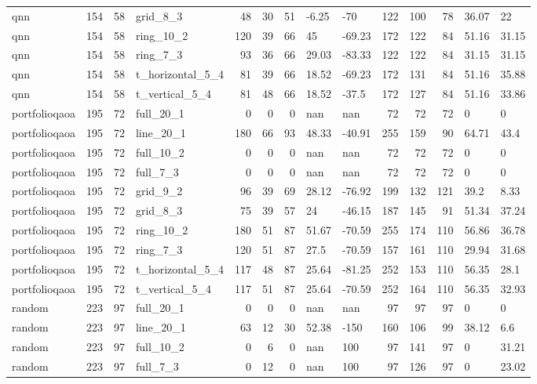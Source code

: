 \begin{longtable}{lrrlrrrllrrrll}
qnn & 154 & 58 & grid\_8\_3 & 48 & 30 & 51 & -6.25 & -70 & 122 & 100 & 78 & 36.07 & 22 \\
qnn & 154 & 58 & ring\_10\_2 & 120 & 39 & 66 & 45 & -69.23 & 172 & 122 & 84 & 51.16 & 31.15 \\
qnn & 154 & 58 & ring\_7\_3 & 93 & 36 & 66 & 29.03 & -83.33 & 122 & 122 & 84 & 31.15 & 31.15 \\
qnn & 154 & 58 & t\_horizontal\_5\_4 & 81 & 39 & 66 & 18.52 & -69.23 & 172 & 131 & 84 & 51.16 & 35.88 \\
qnn & 154 & 58 & t\_vertical\_5\_4 & 81 & 48 & 66 & 18.52 & -37.5 & 172 & 127 & 84 & 51.16 & 33.86 \\
portfolioqaoa & 195 & 72 & full\_20\_1 & 0 & 0 & 0 & nan & nan & 72 & 72 & 72 & 0 & 0 \\
portfolioqaoa & 195 & 72 & line\_20\_1 & 180 & 66 & 93 & 48.33 & -40.91 & 255 & 159 & 90 & 64.71 & 43.4 \\
portfolioqaoa & 195 & 72 & full\_10\_2 & 0 & 0 & 0 & nan & nan & 72 & 72 & 72 & 0 & 0 \\
portfolioqaoa & 195 & 72 & full\_7\_3 & 0 & 0 & 0 & nan & nan & 72 & 72 & 72 & 0 & 0 \\
portfolioqaoa & 195 & 72 & grid\_9\_2 & 96 & 39 & 69 & 28.12 & -76.92 & 199 & 132 & 121 & 39.2 & 8.33 \\
portfolioqaoa & 195 & 72 & grid\_8\_3 & 75 & 39 & 57 & 24 & -46.15 & 187 & 145 & 91 & 51.34 & 37.24 \\
portfolioqaoa & 195 & 72 & ring\_10\_2 & 180 & 51 & 87 & 51.67 & -70.59 & 255 & 174 & 110 & 56.86 & 36.78 \\
portfolioqaoa & 195 & 72 & ring\_7\_3 & 120 & 51 & 87 & 27.5 & -70.59 & 157 & 161 & 110 & 29.94 & 31.68 \\
portfolioqaoa & 195 & 72 & t\_horizontal\_5\_4 & 117 & 48 & 87 & 25.64 & -81.25 & 252 & 153 & 110 & 56.35 & 28.1 \\
portfolioqaoa & 195 & 72 & t\_vertical\_5\_4 & 117 & 51 & 87 & 25.64 & -70.59 & 252 & 164 & 110 & 56.35 & 32.93 \\
random & 223 & 97 & full\_20\_1 & 0 & 0 & 0 & nan & nan & 97 & 97 & 97 & 0 & 0 \\
random & 223 & 97 & line\_20\_1 & 63 & 12 & 30 & 52.38 & -150 & 160 & 106 & 99 & 38.12 & 6.6 \\
random & 223 & 97 & full\_10\_2 & 0 & 6 & 0 & nan & 100 & 97 & 141 & 97 & 0 & 31.21 \\
random & 223 & 97 & full\_7\_3 & 0 & 12 & 0 & nan & 100 & 97 & 126 & 97 & 0 & 23.02 \\

\end{longtable}
